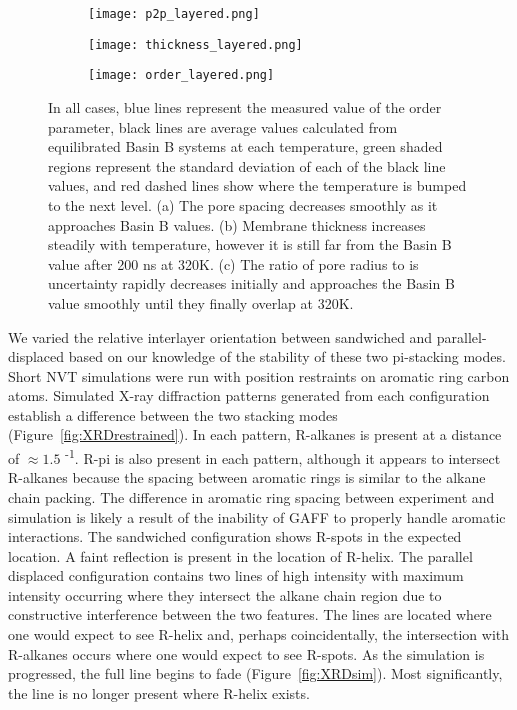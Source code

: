 \begin{figure}
	\centering
	\begin{subfigure}{0.325\textwidth}
		\centering
		\texttt{[image: p2p\_layered.png]}
		\caption{}\label{fig:p2p_layered}
	\end{subfigure}
	\begin{subfigure}{0.325\textwidth}
		\centering
		\texttt{[image: thickness\_layered.png]}
		\caption{}\label{fig:thickness_layered}
	\end{subfigure}
	\begin{subfigure}{0.325\textwidth}
		\centering
		\texttt{[image: order\_layered.png]}
		\caption{}\label{fig:order_layered}
	\end{subfigure}
	\caption{In all cases, blue lines represent the measured value of
	the order parameter, black lines are average values calculated from
	equilibrated Basin B systems at each temperature, green shaded regions
	represent the standard deviation of each of the black line values, and 
	red dashed lines show where the temperature is bumped to the next level.
	(a) The pore spacing decreases smoothly as it approaches Basin B values.
	(b) Membrane thickness increases steadily with temperature, however
	it is still far from the Basin B value after 200 ns at 320K. (c) The
	ratio of pore radius to is uncertainty rapidly decreases initially and
	approaches the Basin B value smoothly until they finally overlap at 320K.}\label{fig:phase_transition}
\end{figure}

We varied the relative interlayer orientation between sandwiched and 
parallel-displaced based on our knowledge of the stability of these two
pi-stacking modes. Short NVT simulations were run with position restraints
on aromatic ring carbon atoms. Simulated X-ray diffraction patterns 
generated from each configuration establish a difference between the two
stacking modes (Figure~\ref{fig:XRDrestrained}). In each pattern, R-alkanes is present at a distance of
$\approx 1.5$ \angstrom \textsuperscript{-1}. R-pi is also present in each 
pattern, although it appears to intersect R-alkanes because the spacing
between aromatic rings is similar to the alkane chain packing. The difference 
in aromatic ring spacing between experiment and simulation is likely a result
of the inability of GAFF to properly handle aromatic interactions. The 
sandwiched configuration shows R-spots in the expected location. A faint
reflection is present in the location of R-helix. The parallel
displaced configuration contains two lines of high intensity with maximum
intensity occurring where they intersect the alkane chain region due to
constructive interference between the two features. The lines are located
where one would expect to see R-helix and, perhaps coincidentally, the 
intersection with R-alkanes occurs where one would expect to see R-spots.
As the simulation is progressed, the full line begins to fade 
(Figure~\ref{fig:XRDsim}). Most significantly, the line is no longer present
where R-helix exists.

